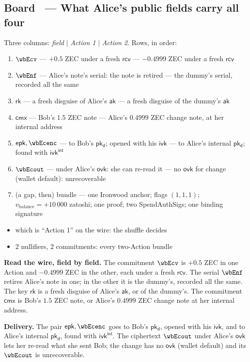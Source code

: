 \documentclass[11pt,a4paper]{article}
\makeatletter
\newcommand{\cmx}{\ensuremath{\mathsf{cmx}}}
\newcommand{\rksym}{\ensuremath{\mathsf{rk}}}
\newcommand{\pkd}{\ensuremath{\mathsf{pk_d}}}
\newcommand{\aksym}{\ensuremath{\mathsf{ak}}}
\newcommand{\ivk}{\ensuremath{\mathsf{ivk}}}
\newcommand{\ovk}{\ensuremath{\mathsf{ovk}}}
\newcommand{\rcv}{\ensuremath{\mathsf{rcv}}}
\newcommand{\epk}{\ensuremath{\mathsf{epk}}}
\newcounter{board}
\newenvironment{board}[2]{\stepcounter{board}%
  \subsection*{Board \theboard\ --- #1 \hfill {\normalfont\small\color{arb}#2}}}{\medskip}
\newcommand{\Draw}{\draw@head{Draw}}
\newcommand{\Write}{\draw@head{Write}}
\newcommand{\Say}{\draw@head{Say}}
\makeatother
\begin{document}
\begin{board}{What Alice's public fields carry}{all four}
\Draw
Three columns: \emph{field} $\mid$ \emph{Action 1} $\mid$ \emph{Action
2}. Rows, in order:
\begin{enumerate}
  \item $\wbEcv$ --- $+0.5$ ZEC under a fresh $\rcv$ --- $-0.4999$ ZEC
    under a fresh $\rcv$
  \item $\wbEnf$ --- Alice's note's serial: the note is retired --- the
    dummy's serial, recorded all the same
  \item $\rksym$ --- a fresh disguise of Alice's $\aksym$ --- a fresh
    disguise of the dummy's $\aksym$
  \item $\cmx$ --- Bob's $1.5$ ZEC note --- Alice's $0.4999$ ZEC change
    note, at her internal address
  \item $\epk, \wbEcenc$ --- to Bob's $\pkd$; opened with his $\ivk$ ---
    to Alice's internal $\pkd$; found with $\ivk^{\mathsf{int}}$
  \item $\wbEcout$ --- under Alice's $\ovk$: she can re-read it --- no
    $\ovk$ for change (wallet default): unrecoverable
  \item (a gap, then) bundle --- one Ironwood anchor; flags $(1, 1, 1)$;
    $v_{\mathrm{balance}} = +10\,000$ zatoshi; one proof; two
    SpendAuthSigs; one binding signature
\end{enumerate}
\Write
\begin{itemize}
  \item which is ``Action 1'' on the wire: the shuffle decides
  \item $2$ nullifiers, $2$ commitments: every two-Action bundle
\end{itemize}
\Say
\textbf{Read the wire, field by field.} The commitment $\wbEcv$ is
$+0.5$ ZEC in one Action and $-0.4999$ ZEC in the other, each under a
fresh $\rcv$. The serial $\wbEnf$ retires Alice's note in one; in the
other it is the dummy's, recorded all the same. The key $\rksym$ is a
fresh disguise of Alice's $\aksym$, or of the dummy's. The commitment
$\cmx$ is Bob's $1.5$ ZEC note, or Alice's $0.4999$ ZEC change note at
her internal address.

\textbf{Delivery.} The pair $\epk, \wbEcenc$ goes to Bob's $\pkd$,
opened with his $\ivk$, and to Alice's internal $\pkd$, found with
$\ivk^{\mathsf{int}}$. The ciphertext $\wbEcout$ under Alice's $\ovk$
lets her re-read what she sent Bob; the change has no $\ovk$ (wallet
default) and its $\wbEcout$ is unrecoverable.


\end{board}
\end{document}
